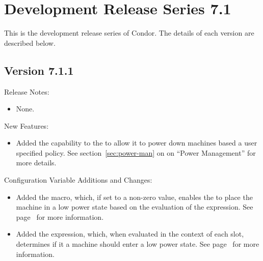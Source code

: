 
\section{\label{sec:History-7-1}Development Release Series 7.1}

This is the development release series of Condor.
The details of each version are described below.

\subsection*{\label{sec:New-7-1-1}Version 7.1.1}

\noindent Release Notes:

\begin{itemize}

\item None.

\end{itemize}


\noindent New Features:

\begin{itemize}

\item Added the capability to the  to allow it to power 
  down machines based a user specified policy.  See 
  section~\ref{sec:power-man} on \pageref{sec:power-man} on
  ``Power Management'' for more details.

\end{itemize}

\noindent Configuration Variable Additions and Changes:

\begin{itemize}

\item Added the  macro, which, if
  set to a non-zero value, enables the  to place the 
  machine in a low power state based on the evaluation of the
   expression.  See 
  page~\pageref{param:HibernateCheckInterval} for more information.

\item Added the  expression, which, when evaluated in
  the context of each slot, determines if it a machine should enter
  a low power state. See page~\pageref{param:Hibernate} for more 
  information.

\end{itemize}


